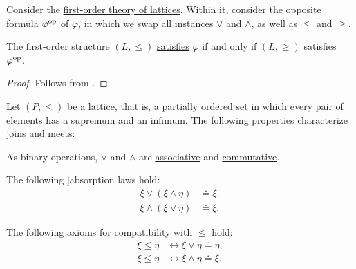 \begin{theorem}\label{thm:lattice_duality}
  Consider the \hyperref[def:lattice/theory]{first-order theory of lattices}. Within it, consider the opposite formula \( \varphi^{\operatorname{op}} \) of \( \varphi \), in which we swap all instances \( \vee \) and \( \wedge \), as well as \( \leq \) and \( \geq \).

  The first-order structure \( (L, \leq) \) \hyperref[def:first_order_model]{satisfies} \( \varphi \) if and only if \( (L, \geq) \) satisfies \( \varphi^{\operatorname{op}} \).
\end{theorem}
\begin{proof}
  Follows from .
\end{proof}

\begin{proposition}\label{thm:lattice_operation_characterization}
  Let \( (P, \leq) \) be a \hyperref[def:lattice]{lattice}, that is, a partially ordered set in which every pair of elements has a supremum and an infimum. The following properties characterize joins and meets:

  \begin{thmenum}
     As binary operations, \( \vee \) and \( \wedge \) are \hyperref[def:binary_operation/associative]{associative} and \hyperref[def:binary_operation/commutative]{commutative}.

     The following \term[en=\cite[8]{Birkhoff1967}]{absorption} laws hold:
    \begin{align}
      \xi \vee (\xi \wedge \eta) &\doteq \xi, \label{eq:thm:lattice_operation_characterization/absorption/join} \\
      \xi \wedge (\xi \vee \eta) &\doteq \xi. \label{eq:thm:lattice_operation_characterization/absorption/meet}
    \end{align}

     The following axioms for compatibility with \( \leq \) hold:
    \begin{align}
      \xi \leq \eta &\leftrightarrow \xi \vee \eta \doteq \eta, \label{eq:thm:lattice_operation_characterization/compatibility/join} \\
      \xi \leq \eta &\leftrightarrow \xi \wedge \eta \doteq \xi. \label{eq:thm:lattice_operation_characterization/compatibility/meet}
    \end{align}
  \end{thmenum}
\end{proposition}
